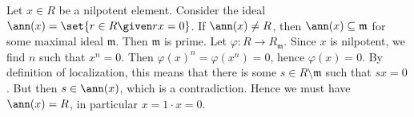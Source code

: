 Let $x \in R$ be a nilpotent element. Consider the ideal
$\ann(x) = \set{r \in R\given rx = 0}$. If $\ann(x)\neq R$, then
$\ann(x) \subseteq \mathfrak{m}$ for some maximal ideal $\mathfrak{m}$. Then
$\mathfrak{m}$ is prime. Let $\varphi\colon R\to R_{\mathfrak{m}}$. Since
$x$ is nilpotent, we find $n$ such that $x^n = 0$. Then $\varphi(x)^n = \varphi(x^n) = 0$,
hence $\varphi(x) = 0$. By definition of localization, this means that there
is some $s \in R\setminus \mathfrak{m}$ such that $sx = 0$. But then
$s \in \ann(x)$, which is a contradiction. Hence we must have $\ann(x) = R$,
in particular $x = 1\cdot x = 0$.
